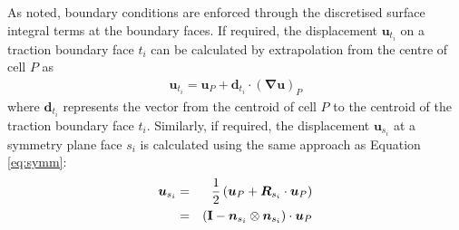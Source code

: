 \documentclass[sn-mathphys,Numbered]{sn-jnl}%
\newcommand{\bb}{\boldsymbol}
\begin{document}
As noted, boundary conditions are enforced through the discretised surface integral terms at the boundary faces. %
If required, the displacement $\bb{u}_{t_i}$ on a traction boundary face $t_i$ can be calculated by extrapolation from the centre of cell $P$ as
\begin{eqnarray}
	\bb{u}_{t_i} = \bb{u}_P + \bb{d}_{t_i} \cdot \left(\bb{\nabla} \bb{u} \right)_P
\end{eqnarray}
where $\bb{d}_{t_i}$ represents the vector from the centroid of cell $P$ to the centroid of the traction boundary face $t_i$.
Similarly, if required, the displacement $\bb{u}_{s_i}$ at a symmetry plane face $s_i$ is calculated using the same approach as Equation \ref{eq:symm}:
\begin{eqnarray} 
	\bb{u}_{s_i}
		&=&  \frac{1}{2} \left( \bb{u}_P + \bb{R}_{s_i} \cdot \bb{u}_P \right) \notag \\
		&=& \left (\textbf{I} - \bb{n}_{s_i} \otimes \bb{n}_{s_i} \right) \cdot \bb{u}_P
\end{eqnarray}
\end{document}
